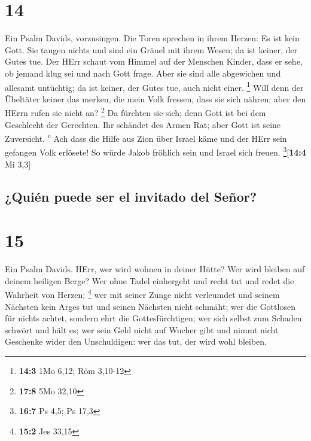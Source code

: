 \hypertarget{section-13}{%
\section{14}\label{section-13}}

 Ein Psalm Davids, vorzusingen. Die Toren sprechen in
ihrem Herzen: Es ist kein Gott. Sie taugen nichts und sind ein Gräuel
mit ihrem Wesen; da ist keiner, der Gutes tue.  Der HErr
schaut vom Himmel auf der Menschen Kinder, dass er sehe, ob jemand klug
sei und nach Gott frage.  Aber sie sind alle abgewichen
und allesamt untüchtig; da ist keiner, der Gutes tue, auch nicht einer.
\footnote{\textbf{14:3} 1Mo 6,12; Röm 3,10-12}  Will denn
der Übeltäter keiner das merken, die mein Volk fressen, dass sie sich
nähren; aber den HErrn rufen sie nicht an? \footnote{\textbf{17:8} 5Mo
  32,10}  Da fürchten sie sich; denn Gott ist bei dem
Geschlecht der Gerechten.  Ihr schändet des Armen Rat;
aber Gott ist seine Zuversicht. \textsuperscript{c}  Ach
dass die Hilfe aus Zion über Israel käme und der HErr sein gefangen Volk
erlösete! So würde Jakob fröhlich sein und Israel sich freuen.
\footnote{\textbf{16:7} Ps 4,5; Ps 17,3}{[}\textbf{14:4} Mi 3,3{]}

\hypertarget{quiuxe9n-puede-ser-el-invitado-del-seuxf1or}{%
\subsection{¿Quién puede ser el invitado del
Señor?}\label{quiuxe9n-puede-ser-el-invitado-del-seuxf1or}}

\hypertarget{section-14}{%
\section{15}\label{section-14}}

 Ein Psalm Davids. HErr, wer wird wohnen in deiner Hütte?
Wer wird bleiben auf deinem heiligen Berge?  Wer ohne
Tadel einhergeht und recht tut und redet die Wahrheit von Herzen;
\footnote{\textbf{15:2} Jes 33,15}  wer mit seiner Zunge
nicht verleumdet und seinem Nächsten kein Arges tut und seinen Nächsten
nicht schmäht;  wer die Gottlosen für nichts achtet,
sondern ehrt die Gottesfürchtigen; wer sich selbst zum Schaden schwört
und hält es;  wer sein Geld nicht auf Wucher gibt und
nimmt nicht Geschenke wider den Unschuldigen: wer das tut, der wird wohl
bleiben.

